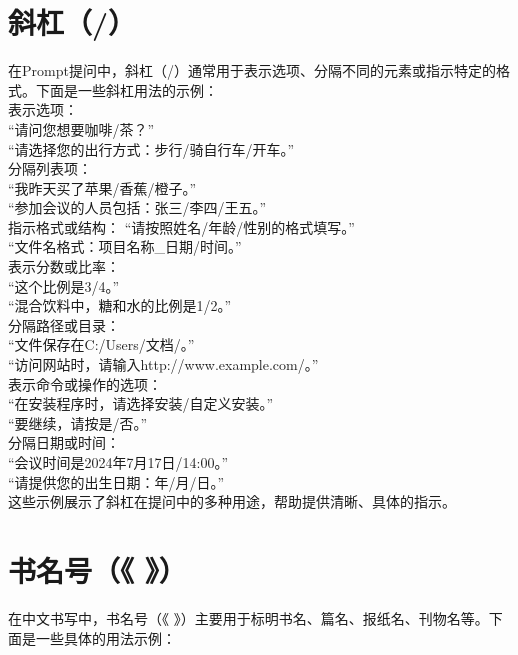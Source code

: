 \documentclass[12pt]{book}
\begin{document}
\section{斜杠（/）}
在Prompt提问中，斜杠（/）通常用于表示选项、分隔不同的元素或指示特定的格式。下面是一些斜杠用法的示例：\\

表示选项：\\
“请问您想要咖啡/茶？”\\
“请选择您的出行方式：步行/骑自行车/开车。”\\
分隔列表项：\\
“我昨天买了苹果/香蕉/橙子。”\\
“参加会议的人员包括：张三/李四/王五。”\\
指示格式或结构：
“请按照姓名/年龄/性别的格式填写。”\\
“文件名格式：项目名称\_日期/时间。”\\
表示分数或比率：\\
“这个比例是3/4。”\\
“混合饮料中，糖和水的比例是1/2。”\\
分隔路径或目录：\\
“文件保存在C:/Users/文档/。”\\
“访问网站时，请输入http://www.example.com/。”\\
表示命令或操作的选项：\\
“在安装程序时，请选择安装/自定义安装。”\\
“要继续，请按是/否。”\\
分隔日期或时间：\\
“会议时间是2024年7月17日/14:00。”\\
“请提供您的出生日期：年/月/日。”\\
这些示例展示了斜杠在提问中的多种用途，帮助提供清晰、具体的指示。\\

\section{书名号（《 》）}
在中文书写中，书名号（《 》）主要用于标明书名、篇名、报纸名、刊物名等。下面是一些具体的用法示例：\\
\end{document}
